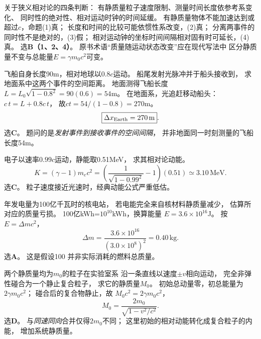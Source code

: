 \problemtext 关于狭义相对论的四条判断：
有静质量粒子速度限制、测量时间长度依参考系变化、
同时性的绝对性、相对运动时钟的时间延缓。
\workings
有静质量物体不能加速达到或超过$c$，命题(1)真；
长度和时间的比较可能依惯性系改变，(2)真；
分离两事件的同时性不是绝对的，(3)假；
相对运动钟的坐标时间间隔相对固有时可延长，(4)真。
选\textbf{B（1、2、4）}。
\crosscheck 原书术语“质量随运动状态改变”应在现代写法中
区分静质量不变与总能量$E=\gamma m_0c^2$可变。

\problemtext 飞船自身长度90m，相对地球以$0.8c$运动。
船尾发射光脉冲并于船头接收到，
求地面系中这两个事件的空间距离。
\workings
地面测得飞船长度
$L=L_0\sqrt{1-0.8^2}=90(0.6)=54$m。
在地面系，光追赶移动船头：
$c\,t=L+0.8c\,t$，
故$ct=54/(1-0.8)=270$m。
\[
\boxed{\Delta x_{\rm Earth}=270\,\mathrm m}.
\]
选\textbf{C}。
\crosscheck 题问的是\emph{发射事件到接收事件的空间间隔}，
并非地面同一时刻测量的飞船长度54m。

\problemtext 电子以速率$0.99c$运动，静能取0.51MeV，
求其相对论动能。
\workings
\[
\boxed{K=(\gamma-1)m_ec^2
=\left(\frac1{\sqrt{1-0.99^2}}-1\right)(0.51)
\simeq3.10\,\mathrm{MeV}}.
\]
选\textbf{C}。
\crosscheck 粒子速度接近光速时，经典动能公式严重低估。

\problemtext 年发电量为100亿千瓦时的核电站，
若电能完全来自核材料静质量减少，
估算所对应的质量亏损。
\workings
100亿kWh=$10^{10}$kWh，换算能量
$E=3.6\times10^{16}$J。
按$E=\Delta mc^2$，
\[
\boxed{\Delta m=\frac{3.6\times10^{16}}
{(3.0\times10^8)^2}=0.40\,\mathrm{kg}}.
\]
选\textbf{A}。
\crosscheck 这是假设100%
并非实际消耗的燃料总质量。

\problemtext 两个静质量均为$m_0$的粒子在实验室系
沿一条直线以速度$\pm v$相向运动，
完全非弹性碰合为一个静止复合粒子，
求它的静质量$M_0$。
\workings
初始总动量零，初总能量为$2\gamma m_0c^2$；
碰合后的复合物静止，故
$M_0c^2=2\gamma m_0c^2$，
\[
\boxed{M_0=\frac{2m_0}{\sqrt{1-v^2/c^2}}}.
\]
选\textbf{D}。
\crosscheck 与\emph{同速同向}合并仅得$2m_0$不同；
这里初始的相对动能转化成复合粒子的内能，
增加系统静质量。

